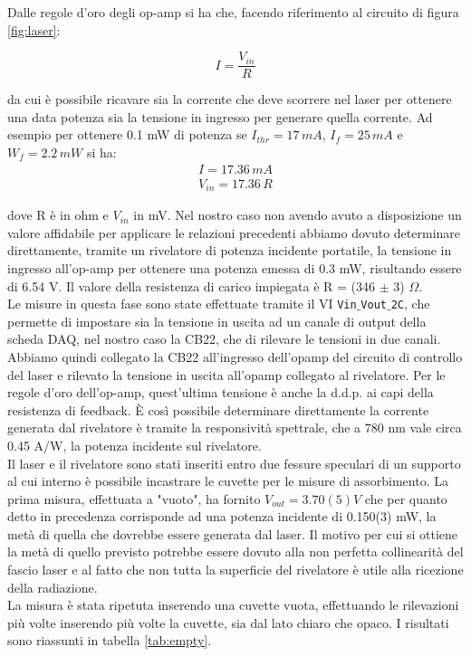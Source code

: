 \documentclass[10pt,letterpaper]{article}
\begin{document}
Dalle regole d'oro degli op-amp si ha che, facendo riferimento al circuito di figura \ref{fig:laser}:

\begin{equation}
I = \frac{V_{in}}{R}
\end{equation}

da cui è possibile ricavare sia la corrente che deve scorrere nel laser per ottenere una data potenza sia la tensione in ingresso per generare quella corrente. Ad esempio per ottenere 0.1 mW di potenza se $I_{thr} = 17\, mA$, $I_f = 25 \, mA$ e $W_f= 2.2 \, mW$ si ha:
\begin{gather}
I = 17.36 \, mA \\
V_{in} = 17.36 \, R
\end{gather}

dove R è in ohm e $V_{in}$ in mV. Nel nostro caso non avendo avuto a disposizione un valore affidabile per applicare le relazioni precedenti abbiamo dovuto determinare direttamente, tramite un rivelatore di potenza incidente portatile,
la tensione in ingresso all'op-amp per ottenere una potenza emessa di 0.3 mW, risultando essere di 6.54 V. Il valore della resistenza di carico impiegata è R = (346 $\pm$ 3) $\Omega$.\\
Le misure in questa fase sono state effettuate tramite il VI \texttt{Vin$\_$Vout$\_$2C}, che permette di impostare sia la tensione in uscita ad un canale di output della scheda DAQ, nel nostro caso la CB22, che di rilevare le tensioni in due canali. Abbiamo quindi collegato la CB22 all'ingresso dell'opamp del circuito di controllo del laser e rilevato la tensione in uscita all'opamp collegato al rivelatore. Per le regole d'oro dell'op-amp, quest'ultima tensione è anche la d.d.p. ai capi della resistenza di feedback. È così possibile determinare direttamente la corrente generata dal rivelatore è tramite la responsività spettrale, che a 780 nm vale circa 0.45 A/W, la potenza incidente sul rivelatore.\\
Il laser e il rivelatore sono stati inseriti entro due fessure speculari di un supporto al cui interno è possibile incastrare le cuvette per le misure di assorbimento. La prima misura, effettuata a "vuoto", ha fornito $V_{out} = 3.70(5) V$ che per quanto detto in precedenza corrisponde ad una potenza incidente di 0.150(3) mW, la metà di quella che dovrebbe essere generata dal laser. Il motivo per cui si ottiene la metà di quello previsto potrebbe essere dovuto alla non perfetta collinearità del fascio laser e al fatto che non tutta la superficie del rivelatore è utile alla ricezione della radiazione.\\
La misura è stata ripetuta inserendo una cuvette vuota, effettuando le rilevazioni più volte inserendo più volte la cuvette, sia dal lato chiaro che opaco. I risultati sono riassunti in tabella \ref{tab:empty}.
\end{document}
